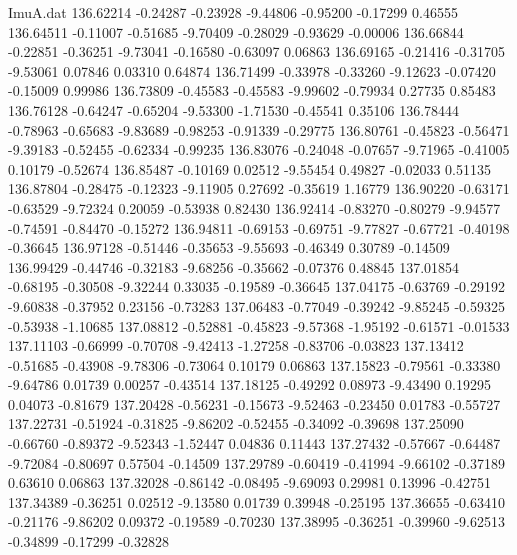 \begin{filecontents}{ImuA.dat}
 136.62214   -0.24287   -0.23928   -9.44806   -0.95200   -0.17299    0.46555
 136.64511   -0.11007   -0.51685   -9.70409   -0.28029   -0.93629   -0.00006
 136.66844   -0.22851   -0.36251   -9.73041   -0.16580   -0.63097    0.06863
 136.69165   -0.21416   -0.31705   -9.53061    0.07846    0.03310    0.64874
 136.71499   -0.33978   -0.33260   -9.12623   -0.07420   -0.15009    0.99986
 136.73809   -0.45583   -0.45583   -9.99602   -0.79934    0.27735    0.85483
 136.76128   -0.64247   -0.65204   -9.53300   -1.71530   -0.45541    0.35106
 136.78444   -0.78963   -0.65683   -9.83689   -0.98253   -0.91339   -0.29775
 136.80761   -0.45823   -0.56471   -9.39183   -0.52455   -0.62334   -0.99235
 136.83076   -0.24048   -0.07657   -9.71965   -0.41005    0.10179   -0.52674
 136.85487   -0.10169    0.02512   -9.55454    0.49827   -0.02033    0.51135
 136.87804   -0.28475   -0.12323   -9.11905    0.27692   -0.35619    1.16779
 136.90220   -0.63171   -0.63529   -9.72324    0.20059   -0.53938    0.82430
 136.92414   -0.83270   -0.80279   -9.94577   -0.74591   -0.84470   -0.15272
 136.94811   -0.69153   -0.69751   -9.77827   -0.67721   -0.40198   -0.36645
 136.97128   -0.51446   -0.35653   -9.55693   -0.46349    0.30789   -0.14509
 136.99429   -0.44746   -0.32183   -9.68256   -0.35662   -0.07376    0.48845
 137.01854   -0.68195   -0.30508   -9.32244    0.33035   -0.19589   -0.36645
 137.04175   -0.63769   -0.29192   -9.60838   -0.37952    0.23156   -0.73283
 137.06483   -0.77049   -0.39242   -9.85245   -0.59325   -0.53938   -1.10685
 137.08812   -0.52881   -0.45823   -9.57368   -1.95192   -0.61571   -0.01533
 137.11103   -0.66999   -0.70708   -9.42413   -1.27258   -0.83706   -0.03823
 137.13412   -0.51685   -0.43908   -9.78306   -0.73064    0.10179    0.06863
 137.15823   -0.79561   -0.33380   -9.64786    0.01739    0.00257   -0.43514
 137.18125   -0.49292    0.08973   -9.43490    0.19295    0.04073   -0.81679
 137.20428   -0.56231   -0.15673   -9.52463   -0.23450    0.01783   -0.55727
 137.22731   -0.51924   -0.31825   -9.86202   -0.52455   -0.34092   -0.39698
 137.25090   -0.66760   -0.89372   -9.52343   -1.52447    0.04836    0.11443
 137.27432   -0.57667   -0.64487   -9.72084   -0.80697    0.57504   -0.14509
 137.29789   -0.60419   -0.41994   -9.66102   -0.37189    0.63610    0.06863
 137.32028   -0.86142   -0.08495   -9.69093    0.29981    0.13996   -0.42751
 137.34389   -0.36251    0.02512   -9.13580    0.01739    0.39948   -0.25195
 137.36655   -0.63410   -0.21176   -9.86202    0.09372   -0.19589   -0.70230
 137.38995   -0.36251   -0.39960   -9.62513   -0.34899   -0.17299   -0.32828

\end{filecontents}
